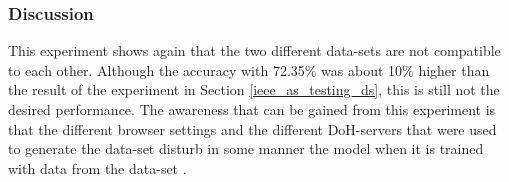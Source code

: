 \subsubsection{Discussion}
This experiment shows again that the two different data-sets are not compatible to each other. Although the accuracy with 72.35\% was about 10\% higher than the result of the experiment in Section \ref{ieee_as_testing_ds}, this is still not the desired performance. The awareness that can be gained from this experiment is that the different browser settings and the different DoH-servers that were used to generate the data-set \cite{ieee_dataset} disturb in some manner the model when it is trained with data from the data-set \cite{CIRA-CIC-DoHBrw-2020}.
